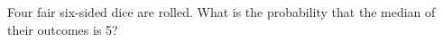 Four fair six-sided dice are rolled. What is the probability that the median of their outcomes is 5?
